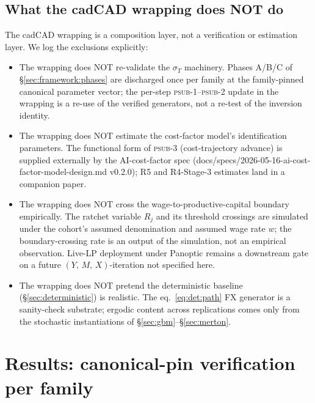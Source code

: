 \documentclass[11pt,letterpaper]{article}
\newcommand{\sigmaT}{\sigma_{T}}
\newcommand{\Ymx}{(Y,\,M,\,X)}
\begin{document}
\subsection{What the cadCAD wrapping does NOT do}
\label{sec:cadcad:nondoes}

The cadCAD wrapping is a composition layer, not a verification or
estimation layer. We log the exclusions explicitly:

\begin{itemize}
    \item The wrapping does NOT re-validate the $\sigmaT$ machinery.
        Phases A/B/C of \S\ref{sec:framework:phases} are discharged
        once per family at the family-pinned canonical parameter
        vector; the per-step \textsc{psub-1}--\textsc{psub-2} update
        in the wrapping is a re-use of the verified generators, not a
        re-test of the inversion identity.
    \item The wrapping does NOT estimate the cost-factor model's
        identification parameters. The functional form of
        \textsc{psub-3} (cost-trajectory advance) is supplied
        externally by the AI-cost-factor spec
        (\textsf{docs/specs/2026-05-16-ai-cost-factor-model-design.md}
        v0.2.0); R5 and R4-Stage-3 estimates land in a companion paper.
    \item The wrapping does NOT cross the wage-to-productive-capital
        boundary empirically. The ratchet variable $R_{j}$ and its
        threshold crossings are simulated under the cohort's assumed
        denomination and assumed wage rate $w$; the boundary-crossing
        rate is an output of the simulation, not an empirical
        observation. Live-LP deployment under Panoptic remains a
        downstream gate on a future \(\Ymx\)-iteration not specified
        here.
    \item The wrapping does NOT pretend the deterministic baseline
        (\S\ref{sec:deterministic}) is realistic. The eq.~\eqref{eq:det:path}
        FX generator is a sanity-check substrate; ergodic content
        across replications comes only from the stochastic
        instantiations of \S\ref{sec:gbm}--\S\ref{sec:merton}.
\end{itemize}

\section{Results: canonical-pin verification per family}
\label{sec:results}
\end{document}
